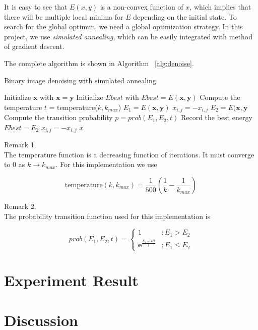 \documentclass{article}
\begin{document}
It is easy to see that $E(x,y)$ is a non-convex function of $x$, which implies that there will be multiple local minima for $E$ depending on the initial state. To search for the global optimun, we need a global optimization strategy. In this project, we use \textit{simulated annealing}, which can be easily integrated with method of gradient descent.

The complete algorithm is shown in Algorithm ~\ref{alg:denoise}.

\begin{algorithm}
\centering
\caption{Binary image denoising with simulated annealing}
\label{alg:denoise}
  \begin{algorithmic}[1]
        \State Initialize $\mathbf{x}$ with $\mathbf{x} = \mathbf{y}$
        \State Initialize $Ebest$ with $Ebest = E(\mathbf{x}, \mathbf{y})$
	    	\State Compute the temperature $t$ = temperature($k,k_{max}$)
	    		\State $E_1 = E(\mathbf{x}, \mathbf{y})$
	    		\State $x_{i,j} = - x_{i,j}$ 
	    		\State $E_2 = E(\mathbf{x}, \mathbf{y}$
	    		\State Compute the transition probability $p = prob(E_1, E_2, t)$
		    			\State Record the best energy $Ebest = E_2$
		    		\EndIf
		    	\Else
		    		\State $x_{i,j} = - x_{i,j}$ 
		    	\EndIf
	    	\EndFor
	    \EndFor
      \Return $x$
    \EndFunction
  \end{algorithmic}
\end{algorithm}

\begin{description}
\item Remark 1.\hfill \\
The temperature function is a decreasing function of iterations. It must converge to $0$ as $k \to k_{max}$. For this implementation we use

$$
\text{temperature}(k, k_{max}) = \frac{1}{500}(\frac{1}{k} - \frac{1}{k_{max}})
$$

\item Remark 2.\hfill \\
The probability transition function used for this implementation is

$$
prob(E_1, E_2, t) =  \left\{
     \begin{array}{lr}
       1 & : E_1 > E_2 \\
       \mathbf{e}^{\frac{E_1 - E2}{t}} & : E_1 \leq E_2
     \end{array}
   \right.
$$

\end{description}

\section{Experiment Result}



\section{Discussion}
\end{document}
